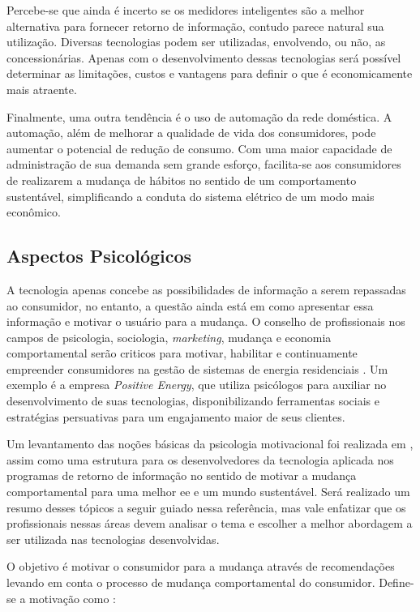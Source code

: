 Percebe-se que ainda é incerto se os medidores inteligentes são a melhor 
alternativa para fornecer retorno de informação, contudo parece natural sua 
utilização. Diversas tecnologias podem ser utilizadas, envolvendo, ou não, as 
concessionárias. Apenas com o desenvolvimento dessas tecnologias será
possível determinar as limitações, custos e vantagens para definir o que é 
economicamente mais atraente.

Finalmente, uma outra tendência é o uso de automação da rede doméstica. A
automação, além de melhorar a qualidade de vida dos consumidores, pode aumentar
o potencial de redução de consumo. Com uma maior capacidade de administração de
sua demanda sem grande esforço, facilita-se aos consumidores de realizarem a
mudança de hábitos no sentido de um comportamento sustentável, simplificando
a conduta do sistema elétrico de um modo mais econômico.

\subsection{Aspectos Psicológicos}
\label{ssec:asp_psic}

A tecnologia apenas concebe as possibilidades de informação a
serem repassadas ao consumidor, no entanto, a questão ainda está em como
apresentar essa informação e motivar o usuário para a mudança. 
O conselho de profissionais nos campos de psicologia, sociologia,
\emph{marketing}, mudança e economia comportamental serão criticos para
motivar, habilitar e continuamente empreender consumidores na gestão de sistemas 
de energia residenciais \cite{aceee_2010_estudos_feedback}. 
Um exemplo é a empresa \emph{Positive Energy}, que utiliza psicólogos para
auxiliar no desenvolvimento de suas tecnologias, disponibilizando ferramentas
sociais e estratégias persuativas para um engajamento maior de seus clientes.

Um levantamento das noções básicas da psicologia motivacional foi realizada em
\cite{2010_aspectos_psicologicos_usa}, assim como uma estrutura para os desenvolvedores 
da tecnologia aplicada nos programas de retorno de informação no sentido de motivar a 
mudança comportamental para uma melhor \gls{ee} e um mundo sustentável.
Será realizado um resumo desses tópicos a seguir guiado nessa referência, mas
vale enfatizar que os profissionais nessas áreas devem analisar o tema e
escolher a melhor abordagem a ser utilizada nas tecnologias desenvolvidas.

O objetivo é motivar o consumidor para a mudança através 
de recomendações levando em conta o processo de mudança comportamental 
do consumidor. Define-se a motivação como 
\cite[p.927-928, tradução própria]{2010_aspectos_psicologicos_usa}:

